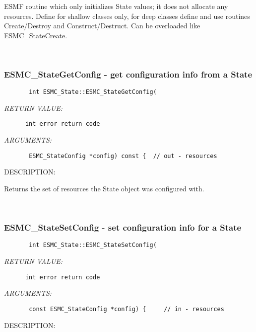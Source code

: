         ESMF routine which only initializes State values; it does not
        allocate any resources.  Define for shallow classes only,
        for deep classes define and use routines Create/Destroy and
        Construct/Destruct.  Can be overloaded like ESMC\_StateCreate.
   
 
\mbox{}\hrulefill\ 
 
\subsubsection{ESMC\_StateGetConfig - get configuration info from a State}


  
\begin{verbatim}       int ESMC_State::ESMC_StateGetConfig(\end{verbatim}{\em RETURN VALUE:}
\begin{verbatim}      int error return code\end{verbatim}{\em ARGUMENTS:}
\begin{verbatim}       ESMC_StateConfig *config) const {  // out - resources\end{verbatim}
{\sf DESCRIPTION:\\ }


      Returns the set of resources the State object was configured with.
   
 
\mbox{}\hrulefill\ 
 
\subsubsection{ESMC\_StateSetConfig - set configuration info for a State}


  
\begin{verbatim}       int ESMC_State::ESMC_StateSetConfig(\end{verbatim}{\em RETURN VALUE:}
\begin{verbatim}      int error return code\end{verbatim}{\em ARGUMENTS:}
\begin{verbatim}       const ESMC_StateConfig *config) {     // in - resources\end{verbatim}
{\sf DESCRIPTION:\\ }


